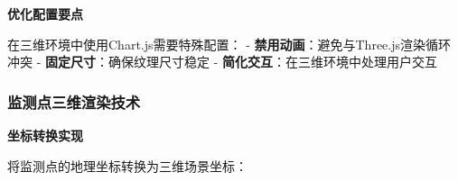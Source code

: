 \begin{Shaded}
\begin{Highlighting}[]
         \OperatorTok{=} \OperatorTok{;}
\NormalTok{    \}}
\NormalTok{\}}
\end{Highlighting}
\end{Shaded}

\textbf{优化配置要点}

在三维环境中使用Chart.js需要特殊配置： - \textbf{禁用动画}：避免与Three.js渲染循环冲突 - \textbf{固定尺寸}：确保纹理尺寸稳定 - \textbf{简化交互}：在三维环境中处理用户交互

\begin{Shaded}
\begin{Highlighting}[]
\OperatorTok{=}\NormalTok{ \{}
    \OperatorTok{:} \OperatorTok{,}
    \OperatorTok{:} \OperatorTok{,}
    \OperatorTok{:}\NormalTok{ \{}
        \OperatorTok{:}\NormalTok{ \{ }\OperatorTok{:} \NormalTok{ \}}\OperatorTok{,}
        \OperatorTok{:}\NormalTok{ \{ }\OperatorTok{:} \NormalTok{ \}}
\NormalTok{    \}}
\NormalTok{\}}\OperatorTok{;}
\end{Highlighting}
\end{Shaded}

\subsubsection{监测点三维渲染技术}\label{ux76d1ux6d4bux70b9ux4e09ux7ef4ux6e32ux67d3ux6280ux672f}

\textbf{坐标转换实现}

将监测点的地理坐标转换为三维场景坐标：

